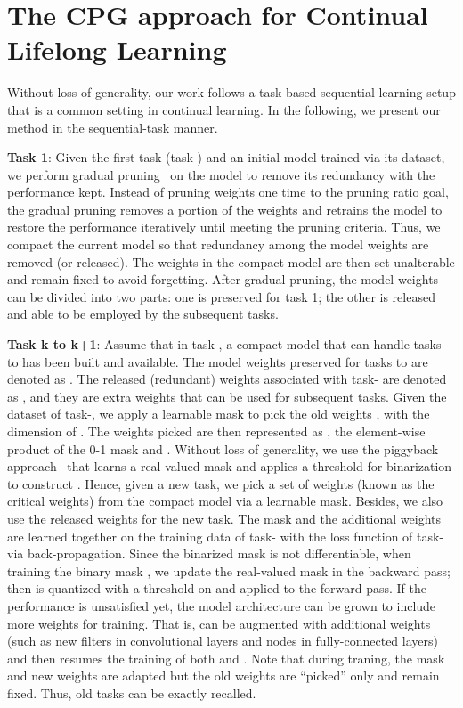 \documentclass{article}
\begin{document}
\section{The CPG approach for Continual Lifelong Learning}

Without loss of generality, our work follows a task-based sequential learning setup that is a common setting in continual learning.
In the following, we present our method in the sequential-task manner.

\noindent\textbf{Task 1}: Given the first task (task-) and an initial model trained via its dataset, we perform gradual pruning~\cite{h.2018to} on the model to remove its redundancy with the performance kept.
Instead of pruning weights one time to the pruning ratio goal, the gradual pruning removes a portion of the weights and retrains the model to restore the performance iteratively until meeting the pruning criteria.
Thus, we compact the current model so that redundancy among the model weights are removed (or released). The weights in the compact model are then set unalterable and remain fixed to avoid forgetting.
After gradual pruning, the model weights can be divided into two parts: one is preserved for task 1; the other is released and able to be employed by the subsequent tasks.

\noindent\textbf{Task k to k+1}: Assume that in task-, a compact model that can handle tasks  to  has been built and available.
The model weights preserved for tasks  to  are denoted as .
The released (redundant) weights associated with task- are denoted as , and they are extra weights that can be used for subsequent tasks.
Given the dataset of task-, we apply a learnable mask  to pick the old weights ,  with  the dimension of .
The weights picked are then represented as , the element-wise product of the 0-1 mask  and .
Without loss of generality, we use the piggyback approach~\cite{Mallya2018PiggybackAA} that learns a real-valued mask  and applies a threshold for binarization to construct .
Hence, given a new task, we pick a set of weights (known as the critical weights) from the compact model via a learnable mask.
Besides, we also use the released weights  for the new task.
The mask  and the additional weights  are learned together on the training data of task- with the loss function of task- via back-propagation.
Since the binarized mask  is not differentiable, when training the binary mask , we update the real-valued mask  in the backward pass; then  is quantized with a threshold on  and applied to the forward pass.
If the performance is unsatisfied yet, the model architecture can be grown to include more weights for training.
That is,  can be augmented with additional weights (such as new filters in convolutional layers and nodes in fully-connected layers) and then resumes the training of both  and .
Note that during traning, the mask  and new weights  are adapted but the old weights  are ``picked'' only and remain fixed.
Thus, old tasks can be exactly recalled.
\end{document}
